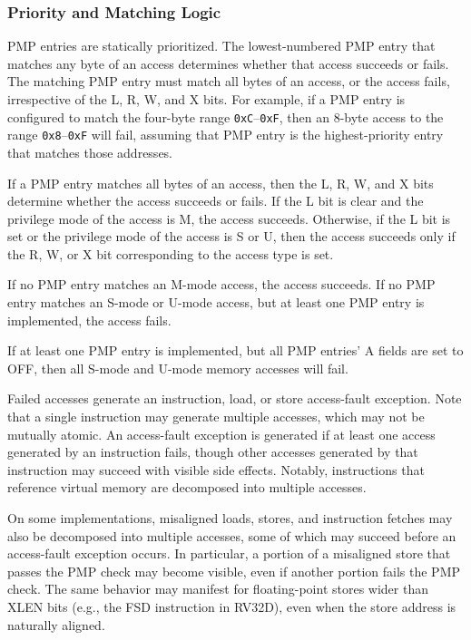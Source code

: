 \subsubsection*{Priority and Matching Logic}

PMP entries are statically prioritized.  The lowest-numbered PMP entry that
matches any byte of an access determines whether that access succeeds or
fails.  The matching PMP entry must match all bytes of an access, or the
access fails, irrespective of the L, R, W, and X bits.  For example, if a PMP
entry is configured to match the four-byte range {\tt 0xC}--{\tt 0xF}, then an
8-byte access to the range {\tt 0x8}--{\tt 0xF} will fail, assuming that
PMP entry is the highest-priority entry that matches those addresses.

If a PMP entry matches all bytes of an access, then the L, R, W, and X bits
determine whether the access succeeds or fails.  If the L bit is clear and the
privilege mode of the access is M, the access succeeds.  Otherwise, if the
L bit is set or the privilege mode of the access is S or U, then the access
succeeds only if the R, W, or X bit corresponding to the access type is set.

If no PMP entry matches an M-mode access, the access succeeds.  If no PMP
entry matches an S-mode or U-mode access, but at least one PMP entry is
implemented, the access fails.

\begin{commentary}
If at least one PMP entry is implemented, but all PMP entries' A fields are
set to OFF, then all S-mode and U-mode memory accesses will fail.
\end{commentary}

Failed accesses generate an instruction, load, or store access-fault exception.  Note
that a single instruction may generate multiple accesses, which may not be
mutually atomic.  An access-fault exception is generated if at least one access
generated by an instruction fails, though other accesses generated by that
instruction may succeed with visible side effects.  Notably, instructions that
reference virtual memory are decomposed into multiple accesses.

On some implementations, misaligned loads, stores, and instruction fetches may
also be decomposed into multiple accesses, some of which may succeed before an
access-fault exception occurs.  In particular, a portion of a misaligned store
that passes the PMP check may become visible, even if another portion fails
the PMP check.  The same behavior may manifest for floating-point stores wider
than XLEN bits (e.g., the FSD instruction in RV32D), even when the store
address is naturally aligned.

